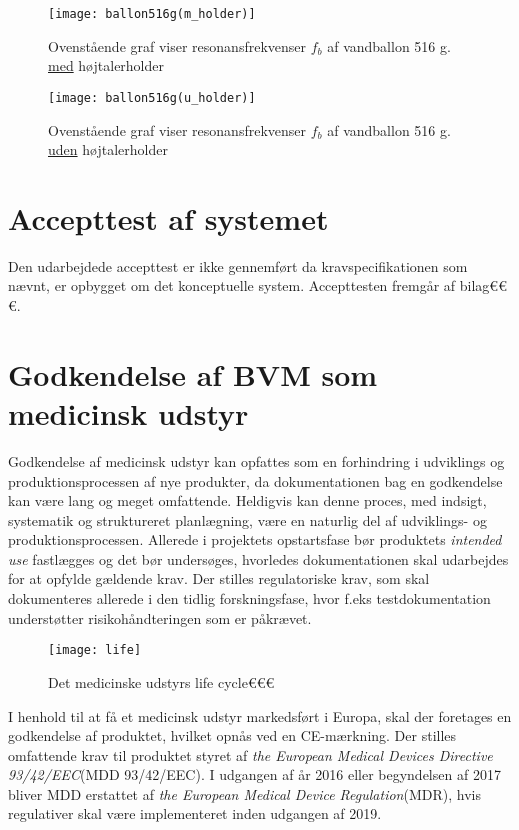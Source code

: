 \begin{figure}[htbp]
  \begin{minipage}[b]{1\linewidth}
    \centering
    \texttt{[image: ballon516g(m\_holder)]}
    \caption{Ovenstående graf viser resonansfrekvenser $f_{b}$  af vandballon 516 g. \underline{med} højtalerholder}
    \label{fig:ballon516g(m_holder)}
  \end{minipage}
  \hspace{1cm}
  \begin{minipage}[b]{1\linewidth}
    \centering
    \texttt{[image: ballon516g(u\_holder)]}
    \caption{Ovenstående graf viser resonansfrekvenser $f_{b}$  af vandballon 516 g. \underline{uden} højtalerholder}
    \label{fig:ballon516g(u_holder)}
  \end{minipage}
\end{figure}




\section{Accepttest af systemet}
Den udarbejdede accepttest er ikke gennemført da kravspecifikationen som nævnt, er opbygget om det konceptuelle system. Accepttesten fremgår af bilag€€€. 

\section{Godkendelse af BVM som medicinsk udstyr}
Godkendelse af medicinsk udstyr kan opfattes som en forhindring i udviklings og produktionsprocessen af nye produkter, da dokumentationen bag en godkendelse kan være lang og meget omfattende. Heldigvis kan denne proces, med indsigt, systematik og struktureret planlægning, være en naturlig del af udviklings- og produktionsprocessen. Allerede i projektets opstartsfase bør produktets \textit{intended use} fastlægges og det bør undersøges, hvorledes dokumentationen skal udarbejdes for at opfylde gældende krav.
Der stilles regulatoriske krav, som skal dokumenteres allerede i den tidlig forskningsfase, hvor f.eks testdokumentation understøtter risikohåndteringen som er påkrævet. 

\begin{figure}[htb]
\centering	
\texttt{[image: life]}
\caption{Det medicinske udstyrs life cycle€€€}
\label{fig:label}
\end{figure}

I henhold til at få et medicinsk udstyr markedsført i Europa, skal der foretages en godkendelse af produktet, hvilket opnås ved en CE-mærkning. Der stilles omfattende krav til produktet styret af \textit{the European Medical Devices Directive 93/42/EEC}{}(MDD 93/42/EEC). I udgangen af år 2016 eller begyndelsen af 2017 bliver MDD erstattet af \textit{the European Medical Device Regulation}{}(MDR), hvis regulativer skal være implementeret inden udgangen af 2019. 
  
